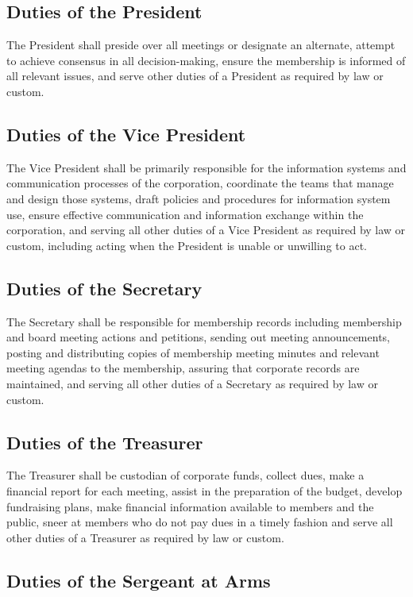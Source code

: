\documentclass[10pt,letterpaper,titlepage]{article}
\begin{document}
\subsection{Duties of the President}

The President shall preside over all meetings or designate an alternate,
attempt to achieve consensus in all decision-making, ensure the membership is
informed of all relevant issues, and serve other duties of a President as
required by law or custom.

\subsection{Duties of the Vice President}

The Vice President shall be primarily responsible for the information systems
and communication processes of the corporation, coordinate the teams that
manage and design those systems, draft policies and procedures for information
system use, ensure effective communication and information exchange within the
corporation, and serving all other duties of a Vice President as required by
law or custom, including acting when the President is unable or unwilling to
act.

\subsection{Duties of the Secretary}

The Secretary shall be responsible for membership records including membership
and board meeting actions and petitions, sending out meeting announcements,
posting and distributing copies of membership meeting minutes and relevant
meeting agendas to the membership, assuring that corporate records are
maintained, and serving all other duties of a Secretary as required by law or
custom.

\subsection{Duties of the Treasurer}

The Treasurer shall be custodian of corporate funds, collect dues, make a
financial report for each meeting, assist in the preparation of the budget,
develop fundraising plans, make financial information available to members and
the public, sneer at members who do not pay dues in a timely fashion and serve
all other duties of a Treasurer as required by law or custom.

\subsection{Duties of the Sergeant at Arms}
\end{document}
